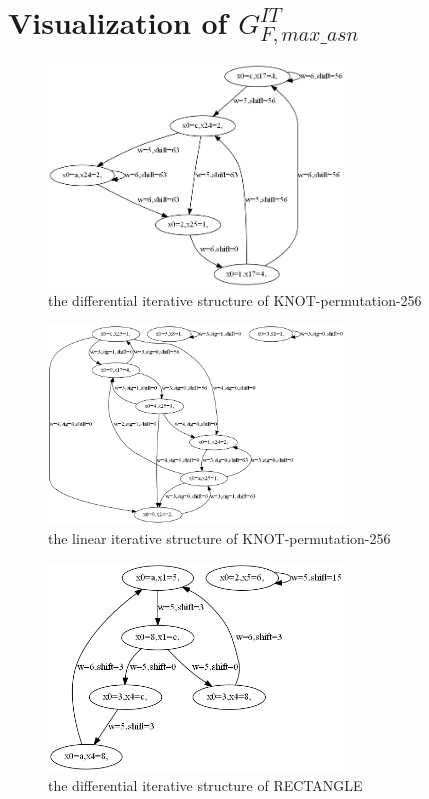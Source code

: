 \appendix

\section{Visualization of $G^{IT}_{F,max\_asn}$\label{app:visualization}}

\begin{figure}
	\centering
	\includegraphics[width=0.7\textwidth]{fig/graph_knot256_ddt.PNG}
	\caption{the differential iterative structure of KNOT-permutation-256} \label{fig:graph_knot256_ddt}
\end{figure}

\begin{figure}
	\centering
	\includegraphics[width=0.7\textwidth]{fig/graph_knot256_lat.PNG}
	\caption{the linear iterative structure of KNOT-permutation-256} \label{fig:graph_knot256_lat}
\end{figure}
\begin{figure}
	\centering
	\includegraphics[width=0.7\textwidth]{fig/graph_rect_ddt.PNG}
	\caption{the differential iterative structure of RECTANGLE} \label{fig:graph_rect_ddt}
\end{figure}

